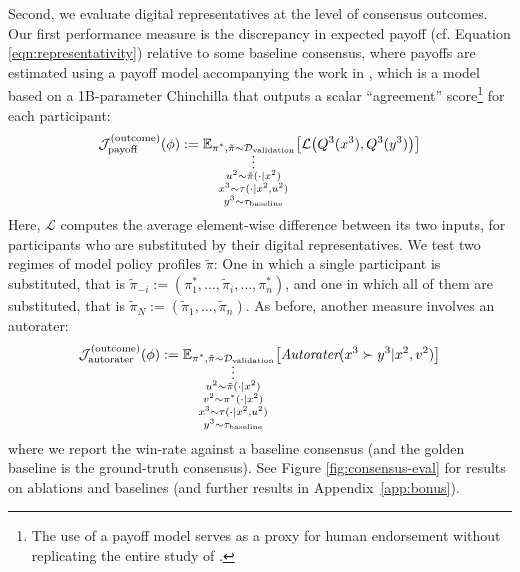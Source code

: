 Second, we evaluate digital representatives at the level of consensus outcomes. Our first performance measure is the discrepancy in expected payoff (cf. Equation \ref{eqn:representativity}) relative to some baseline consensus,
%
where payoffs are estimated using a payoff model accompanying the work in \cite{bakker2022fine,tessler2023submit}, which is a model based on a 1B-parameter Chinchilla \cite{hoffmann2022training} that outputs a scalar ``agreement'' score\footnote{The use of a payoff model serves as a proxy for human endorsement without replicating the entire study of \cite{bakker2022fine,tessler2023submit}.} for each participant:
%
\begin{equation}
\mathcal{J}_{\text{payoff}}^{(\text{outcome})}
(\phi)
:=
\mathbb{E}_{\substack{
\pi^{*},\tilde{\pi}\sim\mathcal{D}_{\text{validation}}\vspace{-5pt}\\
\vdots\\
u^{2}\sim\tilde{\pi}(\cdot|x^{2})\\
x^{3}\sim\tau(\cdot|x^{2},u^{2})\\
y^{3}\sim\tau_{\text{baseline}}
}}
\big[
\mathcal{L}
\big(
Q^{3}(x^{3}),Q^{3}(y^{3})
\big)
\big]
\end{equation}
%
Here, $\mathcal{L}$ computes the average element-wise difference between its two inputs, for participants who are substituted by their digital representatives.
%
We test two regimes of model policy profiles $\tilde{\pi}$:
%
One in which a single participant is substituted,
that is $
\tilde{\pi}_{-i}
:=
(\pi^{*}_{1},\dots,\tilde{\pi}_{i},\dots,\pi^{*}_{n})
$,
%
and one in which all of them are substituted,
that is $
\tilde{\pi}_{N}
:=
(\tilde{\pi}_{1},\dots,\tilde{\pi}_{n})
$.
%
As before, another measure involves an autorater:
%
\begin{equation}
\mathcal{J}_{\text{autorater}}^{(\text{outcome})}
(\phi)
:=
\mathbb{E}_{\substack{
\pi^{*},\tilde{\pi}\sim\mathcal{D}_{\text{validation}}\vspace{-5pt}\\
\vdots\\
u^{2}\sim\tilde{\pi}(\cdot|x^{2})\\
v^{2}\sim\pi^{*}(\cdot|x^{2})\\
x^{3}\sim\tau(\cdot|x^{2},u^{2})\\
y^{3}\sim\tau_{\text{baseline}}
}}
\big[
\textit{Autorater}(x^{3}\succ y^{3}|x^{2},v^{2})
\big]
\end{equation}
%
where we report the win-rate against a baseline consensus (and the golden baseline is the ground-truth consensus). See Figure \ref{fig:consensus-eval} for results on ablations and baselines (and further results in Appendix~\ref{app:bonus}).


